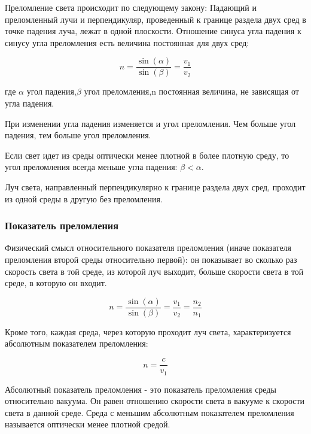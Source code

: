 \documentclass[12pt,a4paper,draft]{article}
\begin{document}
    Преломление света происходит по следующему закону:
    Падающий и преломленный лучи и перпендикуляр, проведенный к границе раздела двух сред в точке падения луча, лежат в одной плоскости. Отношение синуса угла падения к синусу угла преломления есть величина постоянная для двух сред:

    \begin{equation}%
        n = \frac{\sin(\alpha)}{\sin(\beta)} = \frac{v_1}{v_2}
    \end{equation}

    где $\alpha$  угол падения,$\beta$  угол преломления,n  постоянная величина, не зависящая от угла падения.

    При изменении угла падения изменяется и угол преломления. Чем больше угол падения, тем больше угол преломления.

    Если свет идет из среды оптически менее плотной в более плотную среду, то угол преломления всегда меньше угла падения: $\beta < \alpha$.

    Луч света, направленный перпендикулярно к границе раздела двух сред, проходит из одной среды в другую без преломления.

    \subsubsection{Показатель преломления}
        Физический смысл относительного показателя преломления (иначе показателя преломления второй среды относительно первой): он показывает во сколько раз скорость света в той среде, из которой луч выходит, больше скорости света в той среде, в которую он входит.

        \begin{equation}
            n = \frac{\sin(\alpha)}{\sin(\beta)} = \frac{v_1}{v_2} = \frac{n_2}{n_1}
        \end{equation}

        Кроме того, каждая среда, через которую проходит луч света, характеризуется абсолютным показателем преломления:

        \begin{equation}
            n = \frac{c}{v_1}
        \end{equation}

        Абсолютный показатель преломления - это показатель преломления среды относительно вакуума. Он равен отношению скорости света в вакууме к скорости света в данной среде.
        Среда с меньшим абсолютным показателем преломления называется оптически менее плотной средой.
\end{document}
